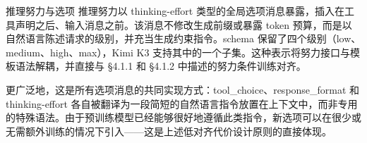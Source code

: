 推理努力与选项 推理努力以 thinking-effort 类型的全局选项消息暴露，插入在工具声明之后、输入消息之前。该消息不修改生成前缀或暴露 token 预算，而是以自然语言陈述请求的级别，并充当生成约束指令。schema 保留了四个级别（low、medium、high、max），Kimi K3 支持其中的一个子集。这种表示将努力接口与模板语法解耦，并直接与 §4.1.1 和 §4.1.2 中描述的努力条件训练对齐。

更广泛地，这是所有选项消息的共同实现方式：tool\_choice、response\_format 和 thinking-effort 各自被翻译为一段简短的自然语言指令放置在上下文中，而非专用的特殊语法。由于预训练模型已经能够很好地遵循此类指令，新选项可以在很少或无需额外训练的情况下引入——这是上述低对齐代价设计原则的直接体现。
